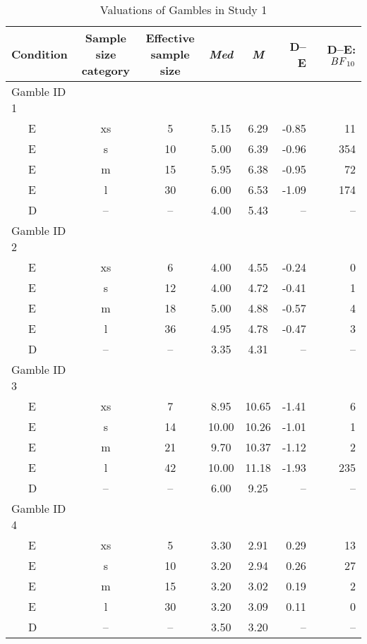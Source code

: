 \documentclass[a4paper, man, floatsintext]{apa6}
\begin{document}
\begin{table}[tbp]

\begin{center}
\begin{threeparttable}

\caption{\label{tab:means_study2}Valuations of Gambles in Study 1}

\begin{tabular}{lccccrr}
\toprule
Condition & Sample size category & Effective sample size & \textit{Med} & \textit{M} & D--E & D--E:$BF\textsubscript{10}$\\
\midrule
Gamble ID 1 &  &  &  &  &  & \\
\ \ \ E & xs & 5 & 5.15 & 6.29 & -0.85 & 11\\
\ \ \ E & s & 10 & 5.00 & 6.39 & -0.96 & 354\\
\ \ \ E & m & 15 & 5.95 & 6.38 & -0.95 & 72\\
\ \ \ E & l & 30 & 6.00 & 6.53 & -1.09 & 174\\
\ \ \ D & -- & -- & 4.00 & 5.43 & -- & --\\
Gamble ID 2 &  &  &  &  &  & \\
\ \ \ E & xs & 6 & 4.00 & 4.55 & -0.24 & 0\\
\ \ \ E & s & 12 & 4.00 & 4.72 & -0.41 & 1\\
\ \ \ E & m & 18 & 5.00 & 4.88 & -0.57 & 4\\
\ \ \ E & l & 36 & 4.95 & 4.78 & -0.47 & 3\\
\ \ \ D & -- & -- & 3.35 & 4.31 & -- & --\\
Gamble ID 3 &  &  &  &  &  & \\
\ \ \ E & xs & 7 & 8.95 & 10.65 & -1.41 & 6\\
\ \ \ E & s & 14 & 10.00 & 10.26 & -1.01 & 1\\
\ \ \ E & m & 21 & 9.70 & 10.37 & -1.12 & 2\\
\ \ \ E & l & 42 & 10.00 & 11.18 & -1.93 & 235\\
\ \ \ D & -- & -- & 6.00 & 9.25 & -- & --\\
Gamble ID 4 &  &  &  &  &  & \\
\ \ \ E & xs & 5 & 3.30 & 2.91 & 0.29 & 13\\
\ \ \ E & s & 10 & 3.20 & 2.94 & 0.26 & 27\\
\ \ \ E & m & 15 & 3.20 & 3.02 & 0.19 & 2\\
\ \ \ E & l & 30 & 3.20 & 3.09 & 0.11 & 0\\
\ \ \ D & -- & -- & 3.50 & 3.20 & -- & --\\

\end{tabular}
\end{threeparttable}
\end{center}
\end{table}
\end{document}
